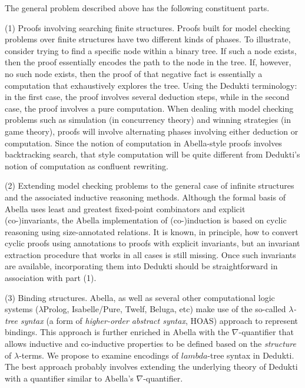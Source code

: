 \begin{workpackage}[id=theories,wphases=0-48,type=RTD,
  short=Theories in Dedukti,%
  title= Defining theories in Dedukti,
  lead=UIn,
  UInRM=10]
\begin{tasklist}
\begin{task}[id=abella,title=Express the theory of Abella in Dedukti and instrument the system]
The general problem described above has the following constituent parts.

(1) Proofs involving searching finite structures. Proofs built for
model checking problems over finite structures have two different
kinds of phases.  To illustrate, consider trying to find a specific
node within a binary tree.  If such a node exists, then the proof
essentially encodes the path to the node in the tree.  If, however, no
such node exists, then the proof of that negative fact is essentially
a computation that exhaustively explores the tree.  Using the Dedukti
terminology: in the first case, the proof involves several deduction
steps, while in the second case, the proof involves a pure
computation. When dealing with model checking problems such as
simulation (in concurrency theory) and winning strategies (in game
theory), proofs will involve alternating phases involving either
deduction or computation.  Since the notion of computation in
Abella-style proofs involves backtracking search, that style
computation will be quite different from Dedukti's notion of
computation as confluent rewriting.

(2) Extending model checking problems to the general case of infinite
structures and the associated inductive reasoning methods. Although
the formal basis of Abella uses least and greatest fixed-point
combinators and explicit (co-)invariants, the Abella implementation of
(co-)induction is based on cyclic reasoning using size-annotated
relations. It is known, in principle, how to convert cyclic proofs
using annotations to proofs with explicit invariants, but an invariant
extraction procedure that works in all cases is still missing. Once
such invariants are available, incorporating them into Dedukti should
be straightforward in association with part (1).

(3) Binding structures. Abella, as well as several other computational
logic systems ($\lambda$Prolog, Isabelle/Pure, Twelf, Beluga, etc)
make use of the so-called \emph{$\lambda$-tree syntax} (a form of
\emph{higher-order abstract syntax}, HOAS) approach to represent
bindings. This approach is further enriched in Abella with the
$\nabla$-quantifier that allows inductive and co-inductive properties
to be defined based on the \emph{structure} of $\lambda$-terms. We
propose to examine encodings of $lambda$-tree syntax in Dedukti. The
best approach probably involves extending the underlying theory of
Dedukti with a quantifier similar to Abella's $\nabla$-quantifier.


\end{task}
\end{tasklist}
\end{workpackage}
